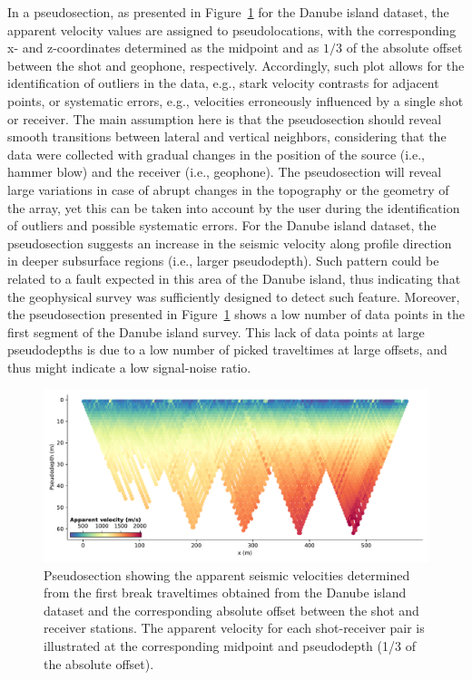 \documentclass[a4paper,fleqn]{cas-sc}
\begin{document}
In a pseudosection, as presented in Figure~\ref{fig:rollalong_pseudosection} for the Danube island dataset, the apparent velocity values are assigned to pseudolocations, with the corresponding x- and z-coordinates determined as the midpoint and as $1/3$ of the absolute offset between the shot and geophone, respectively.
Accordingly, such plot allows for the identification of outliers in the data, e.g., stark velocity contrasts for adjacent points, or systematic errors, e.g., velocities erroneously influenced by a single shot or receiver. The main assumption here is that the pseudosection should reveal smooth transitions between lateral and vertical neighbors, considering that the data were collected with gradual changes in the position of the source (i.e., hammer blow) and the receiver (i.e., geophone). The pseudosection will reveal large variations in case of abrupt changes in the topography or the geometry of the array, yet this can be taken into account by the user during the identification of outliers and possible systematic errors.
For the Danube island dataset, the pseudosection suggests an increase in the seismic velocity along profile direction in deeper subsurface regions (i.e., larger pseudodepth). Such pattern could be related to a fault expected in this area of the Danube island, thus indicating that the geophysical survey was sufficiently designed to detect such feature.
Moreover, the pseudosection presented in Figure~\ref{fig:rollalong_pseudosection} shows a low number of data points in the first segment of the Danube island survey. This lack of data points at large pseudodepths is due to a low number of picked traveltimes at large offsets, and thus might indicate a low signal-noise ratio.
\begin{figure}
	\centering
	\includegraphics[width=.75\textwidth]{figures/rollalong_pseudosection.pdf}
	\caption{Pseudosection showing the apparent seismic velocities determined from the first break traveltimes obtained from the Danube island dataset and the corresponding absolute offset between the shot and receiver stations. The apparent velocity for each shot-receiver pair is illustrated at the corresponding midpoint and pseudodepth (1/3 of the absolute offset).}
	\label{fig:rollalong_pseudosection}
\end{figure}
\end{document}
